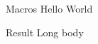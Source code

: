 \begin{frame}{Macros}
{%
\small\color{red}
Hello
World
}
{%
\small\color{red}
}
\begin{infobox}{%
Result
}
Long
body
\end{infobox}
\end{frame}
